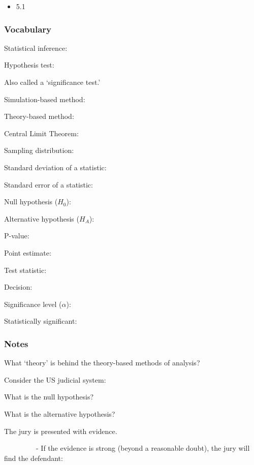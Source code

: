 \documentclass[
]{report}
\providecommand{\tightlist}{%
  \setlength{\itemsep}{0pt}\setlength{\parskip}{0pt}}
\newcommand{\rgs}{\vspace{12pt}} %
\newcommand{\rgi}{\hspace{24pt}}  %
\begin{document}
\begin{itemize}
\tightlist
\item
  5.1
\end{itemize}


\hypertarget{vocabulary-10}{%
\subsubsection*{Vocabulary}\label{vocabulary-10}}

Statistical inference:
\rgs

Hypothesis test:

\rgi Also called a `significance test.'
\rgs

Simulation-based method:
\rgs

Theory-based method:
\rgs

Central Limit Theorem:
\rgs

Sampling distribution:
\rgs

Standard deviation of a statistic:
\rgs

Standard error of a statistic:
\rgs

Null hypothesis (\(H_0\)):
\rgs

Alternative hypothesis (\(H_A\)):
\rgs

P-value:
\rgs

Point estimate:
\rgs

Test statistic:
\rgs

Decision:
\rgs

Significance level (\(\alpha\)):
\rgs 

Statistically significant:
\rgs

\hypertarget{notes-15}{%
\subsubsection*{Notes}\label{notes-15}}

What `theory' is behind the theory-based methods of analysis?
\rgs

Consider the US judicial system:

\rgi What is the null hypothesis?
\rgs

\rgi What is the alternative hypothesis?
\rgs

\rgi The jury is presented with evidence.

~~~~~~~~~- If the evidence is strong (beyond a reasonable doubt), the jury will find the defendant:
\end{document}
